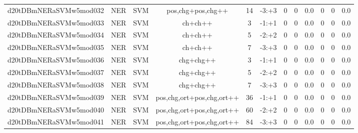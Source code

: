\documentclass[a4paper]{article}
\begin{document}
\begin{landscape}
\begin{center}
\begin{tabular}{ |c|c|c|c|c|c|c|c|c|c|c|c|}
 
 	
 	\small{ d20tDBmNERaSVMw5mod032 } & \small{ NER} & \small{  SVM }  & pos,chg+pos,chg++  &  14 &  \small{  -3:+3 }  &  0 & 0 & 0.0  &  0 & 0 & 0.0 \\
 	

 
 	
 	\small{ d20tDBmNERaSVMw5mod033 } & \small{ NER} & \small{  SVM }  & ch+ch++  &  3 &  \small{  -1:+1 }  &  0 & 0 & 0.0  &  0 & 0 & 0.0 \\
 	

 
 	
 	\small{ d20tDBmNERaSVMw5mod034 } & \small{ NER} & \small{  SVM }  & ch+ch++  &  5 &  \small{  -2:+2 }  &  0 & 0 & 0.0  &  0 & 0 & 0.0 \\
 	

 
 	
 	\small{ d20tDBmNERaSVMw5mod035 } & \small{ NER} & \small{  SVM }  & ch+ch++  &  7 &  \small{  -3:+3 }  &  0 & 0 & 0.0  &  0 & 0 & 0.0 \\
 	

 
 	
 	\small{ d20tDBmNERaSVMw5mod036 } & \small{ NER} & \small{  SVM }  & chg+chg++  &  3 &  \small{  -1:+1 }  &  0 & 0 & 0.0  &  0 & 0 & 0.0 \\
 	

 
 	
 	\small{ d20tDBmNERaSVMw5mod037 } & \small{ NER} & \small{  SVM }  & chg+chg++  &  5 &  \small{  -2:+2 }  &  0 & 0 & 0.0  &  0 & 0 & 0.0 \\
 	

 
 	
 	\small{ d20tDBmNERaSVMw5mod038 } & \small{ NER} & \small{  SVM }  & chg+chg++  &  7 &  \small{  -3:+3 }  &  0 & 0 & 0.0  &  0 & 0 & 0.0 \\
 	

 
 	
 	\small{ d20tDBmNERaSVMw5mod039 } & \small{ NER} & \small{  SVM }  & pos,chg,ort+pos,chg,ort++  &  36 &  \small{  -1:+1 }  &  0 & 0 & 0.0  &  0 & 0 & 0.0 \\
 	

 
 	
 	\small{ d20tDBmNERaSVMw5mod040 } & \small{ NER} & \small{  SVM }  & pos,chg,ort+pos,chg,ort++  &  60 &  \small{  -2:+2 }  &  0 & 0 & 0.0  &  0 & 0 & 0.0 \\
 	

 
 	
 	\small{ d20tDBmNERaSVMw5mod041 } & \small{ NER} & \small{  SVM }  & pos,chg,ort+pos,chg,ort++  &  84 &  \small{  -3:+3 }  &  0 & 0 & 0.0  &  0 & 0 & 0.0 \\
 	


\end{tabular}
\end{center}
\end{landscape}
\end{document}
